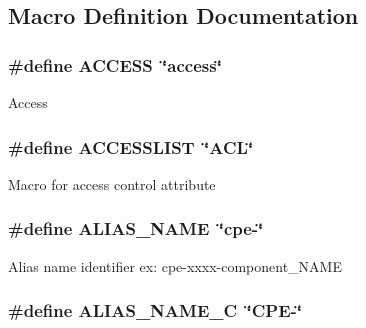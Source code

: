 \subsection{Macro Definition Documentation}
\hypertarget{group__LIBHELP_ga321a20f839f3d9ccd0db1dc865850dc7}{
\subsubsection[{A\-C\-C\-E\-S\-S}]{\setlength{\rightskip}{0pt plus 5cm}\#define A\-C\-C\-E\-S\-S~\char`\"{}access\char`\"{}}}\label{group__LIBHELP_ga321a20f839f3d9ccd0db1dc865850dc7}
Access \hypertarget{group__LIBHELP_ga449d3babf595d8210dbb578ac66aa0f4}{
\subsubsection[{A\-C\-C\-E\-S\-S\-L\-I\-S\-T}]{\setlength{\rightskip}{0pt plus 5cm}\#define A\-C\-C\-E\-S\-S\-L\-I\-S\-T~\char`\"{}A\-C\-L\char`\"{}}}\label{group__LIBHELP_ga449d3babf595d8210dbb578ac66aa0f4}
Macro for access control attribute \hypertarget{group__LIBHELP_ga3ded1cb037978951bed86d0abbef95ac}{
\subsubsection[{A\-L\-I\-A\-S\-\_\-\-N\-A\-M\-E}]{\setlength{\rightskip}{0pt plus 5cm}\#define A\-L\-I\-A\-S\-\_\-\-N\-A\-M\-E~\char`\"{}cpe-\/\char`\"{}}}\label{group__LIBHELP_ga3ded1cb037978951bed86d0abbef95ac}
Alias name identifier ex\-: cpe-\/xxxx-\/component\-\_\-\-N\-A\-M\-E \hypertarget{group__LIBHELP_gab8a772dc3a953e57a76d6616c0dbe0ef}{
\subsubsection[{A\-L\-I\-A\-S\-\_\-\-N\-A\-M\-E\-\_\-\-C}]{\setlength{\rightskip}{0pt plus 5cm}\#define A\-L\-I\-A\-S\-\_\-\-N\-A\-M\-E\-\_\-\-C~\char`\"{}C\-P\-E-\/\char`\"{}}}\label{group__LIBHELP_gab8a772dc3a953e57a76d6616c0dbe0ef}
